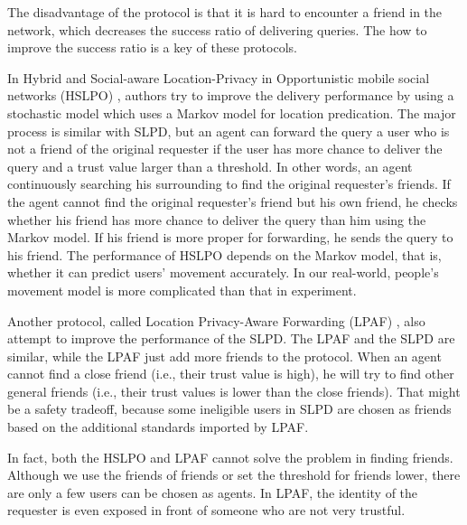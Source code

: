 The disadvantage of the protocol is that it is hard to encounter a friend in the network, which decreases the success ratio of delivering queries. The how to improve the success ratio is a key of these protocols.

In Hybrid and Social-aware Location-Privacy in Opportunistic mobile social networks (HSLPO) \cite {C17}, authors try to improve the delivery performance by using a stochastic model which uses a Markov model for location predication. The major process is similar with SLPD, but an agent can forward the query a user who is not a friend of the original requester if the user has more chance to deliver the query and a trust value larger than a threshold. In other words, an agent continuously searching his surrounding to find the original requester's friends. If the agent cannot find the original requester's friend but his own friend, he checks whether his friend has more chance to deliver the query than him using the Markov model. If his friend is more proper for forwarding, he sends the query to his friend. The performance of HSLPO depends on the Markov model, that is, whether it can predict users' movement accurately. In our real-world, people's movement model is more complicated than that in experiment.

Another protocol, called Location Privacy-Aware Forwarding (LPAF) \cite {C18}, also attempt to improve the performance of the SLPD. The LPAF and the SLPD are similar, while the LPAF just add more friends to the protocol. When an agent cannot find a close friend (i.e., their trust value is high), he will try to find other general friends (i.e., their trust values is lower than the close friends). That might be a safety tradeoff, because some ineligible users in SLPD are chosen as friends based on the additional standards imported by LPAF.

In fact, both the HSLPO and LPAF cannot solve the problem in finding friends. Although we use the friends of friends or set the threshold for friends lower, there are only a few users can be chosen as agents. In LPAF, the identity of the requester is even exposed in front of someone who are not very trustful. 




















